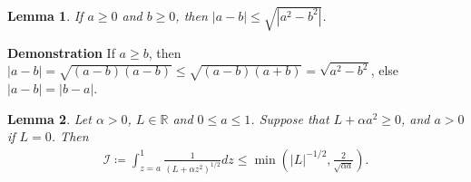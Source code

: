 \documentclass{article}
\newtheorem{lem}{Lemma}[section]
\numberwithin{equation}{section}
\newcommand{\myproof}[1]{
	\noindent \textbf{Demonstration}
	{\small	#1 \hfill \qedsymbol}
}
\begin{document}
\begin{lem}\label{lem:maj_dist_square}
	If $a\geqslant0$ and $b\geqslant0$, then $|a - b| \leqslant \sqrt{|a^2 - b^2|}$.
\end{lem}

\myproof{
	If $a \geqslant b$, then $|a - b| = \sqrt{(a-b)(a-b)} \leqslant \sqrt{(a - b)(a+b)} = \sqrt{a^2 - b^2}$, else $|a-b|=|b-a|$. 
}

\begin{lem}\label{lem:maj_fi}
	Let $\alpha>0$, $L \in \mathbb{R}$ and $0 \leqslant a \leqslant 1$. Suppose that $L + \alpha a^2 \geqslant 0$, and $a>0$ if $L=0$. Then
	\begin{align*}
		\mathcal{I} \coloneqq \int_{z=a}^1 \frac{1}{\left(L + \alpha z^2\right)^{1/2}} dz \leqslant 
		\min\left(|L|^{-1/2}, \frac{2}{\sqrt{\alpha a}}\right).
	\end{align*}
\end{lem}
\end{document}
